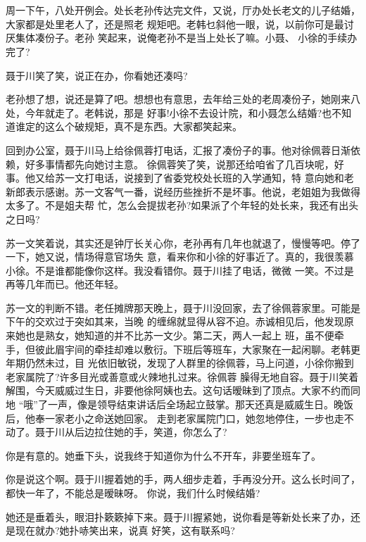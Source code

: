 \documentclass[11pt,a4paper,onecolumn]{article}
\begin{document}
\section[\thesection]{}

周一下午，八处开例会。处长老孙传达完文件，又说，厅办处长老文的儿子结婚，大家都是处里老人了，还是照老
规矩吧。老韩乜斜他一眼，说，以前你可是最讨厌集体凑份子。老孙 笑起来，说俺老孙不是当上处长了嘛。小聂、
小徐的手续办完了?

聂于川笑了笑，说正在办，你看她还凑吗?

老孙想了想，说还是算了吧。想想也有意思，去年给三处的老周凑份子，她刚来八处，今年就走了。老韩说，那是
好事!小徐不去设计院，和小聂怎么结婚?也不知道谁定的这么个破规矩，真不是东西。大家都笑起来。

回到办公室，聂于川马上给徐佩蓉打电话，汇报了凑份子的事。他对徐佩蓉日渐依赖，好多事情都先向她讨主意。
徐佩蓉笑了笑，说那还给咱省了几百块呢，好事。他又给苏一文打电话，说接到了省委党校处长班的入学通知，特
意向她和老新郎表示感谢。苏一文客气一番，说经历些挫折不是坏事。他说，老姐姐为我做得太多了。不是姐夫帮
忙，怎么会提拔老孙?如果派了个年轻的处长来，我还有出头之日吗?

苏一文笑着说，其实还是钟厅长关心你，老孙再有几年也就退了，慢慢等吧。停了一下，她又说，情场得意官场失
意，看来你和小徐的好事近了。真的，我很羡慕小徐。不是谁都能像你这样。我没看错你。聂于川挂了电话，微微
一笑。不过是再等几年而已。他还年轻。

苏一文的判断不错。老任摊牌那天晚上，聂于川没回家，去了徐佩蓉家里。可能是下午的交欢过于突如其来，当晚
的缠绵就显得从容不迫。赤诚相见后，他发现原来她也是熟女，她知道的并不比苏一文少。第二天，两人一起上
班，虽不便牵手，但彼此眉宇间的牵挂却难以敷衍。下班后等班车，大家聚在一起闲聊。老韩更年期仍然未过，目
光依旧敏锐，发现了人群里的徐佩蓉，马上问道，小徐你搬到老家属院了?许多目光或善意或火辣地扎过来。徐佩蓉
臊得无地自容。聂于川笑着解围，今天威威过生日，非要他徐阿姨也去。这句话暧昧到了顶点。大家不约而同地
“哦”了一声，像是领导结束讲话后全场起立鼓掌。那天还真是威威生日。晚饭后，他奉一家老小之命送她回家。
走到老家属院门口，她忽地停住，一步也走不动了。聂于川从后边拉住她的手，笑道，你怎么了?

你是有意的。她垂下头，说我终于知道你为什么不开车，非要坐班车了。

你是说这个啊。聂于川握着她的手，两人细步走着，手再没分开。这么长时间了，都快一年了，不能总是暧昧呀。
你说，我们什么时候结婚?

她还是垂着头，眼泪扑簌簌掉下来。聂于川握紧她，说你看是等新处长来了办，还是现在就办?她扑哧笑出来，说真
好笑，这有联系吗?
\end{document}
